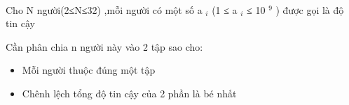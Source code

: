  

Cho N người(2≤N≤32) ,mỗi người có một số a $_ i $ (1 ≤ a $_ i $ ≤ 10 $^ 9 $ ) được gọi là độ tin cậy

Cần phân chia n người này vào 2 tập sao cho:
\begin{itemize}
	\item Mỗi người thuộc đúng một tập
	\item Chênh lệch tổng độ tin cậy của 2 phần là bé nhất
\end{itemize}

\